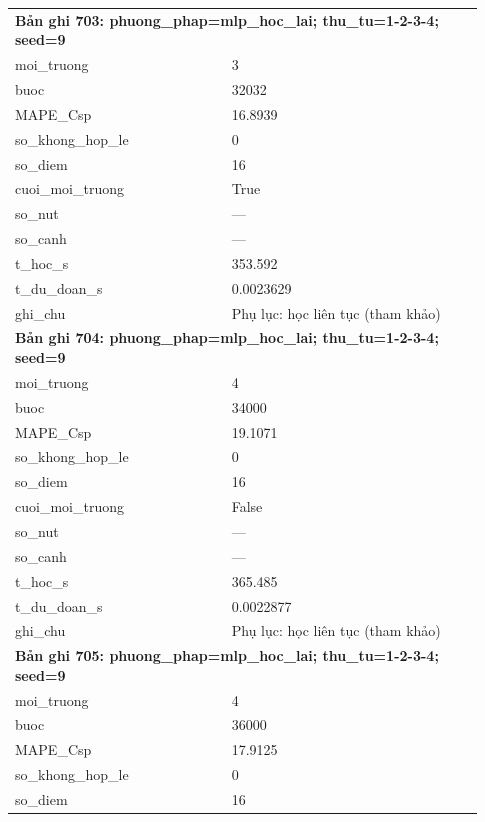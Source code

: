 \begin{longtable}{p{0.43\linewidth}p{0.50\linewidth}}
\midrule
\multicolumn{2}{p{0.95\linewidth}}{\textbf{Bản ghi 703: phuong\_phap=mlp\_hoc\_lai; thu\_tu=1-2-3-4; seed=9}} \\
moi\_\allowbreak truong & 3 \\
buoc & 32032 \\
MAPE\_\allowbreak Csp & 16.8939 \\
so\_\allowbreak khong\_\allowbreak hop\_\allowbreak le & 0 \\
so\_\allowbreak diem & 16 \\
cuoi\_\allowbreak moi\_\allowbreak truong & True \\
so\_\allowbreak nut & — \\
so\_\allowbreak canh & — \\
t\_\allowbreak hoc\_\allowbreak s & 353.592 \\
t\_\allowbreak du\_\allowbreak doan\_\allowbreak s & 0.0023629 \\
ghi\_\allowbreak chu & Phụ lục: học liên tục (tham khảo) \\
\midrule
\multicolumn{2}{p{0.95\linewidth}}{\textbf{Bản ghi 704: phuong\_phap=mlp\_hoc\_lai; thu\_tu=1-2-3-4; seed=9}} \\
moi\_\allowbreak truong & 4 \\
buoc & 34000 \\
MAPE\_\allowbreak Csp & 19.1071 \\
so\_\allowbreak khong\_\allowbreak hop\_\allowbreak le & 0 \\
so\_\allowbreak diem & 16 \\
cuoi\_\allowbreak moi\_\allowbreak truong & False \\
so\_\allowbreak nut & — \\
so\_\allowbreak canh & — \\
t\_\allowbreak hoc\_\allowbreak s & 365.485 \\
t\_\allowbreak du\_\allowbreak doan\_\allowbreak s & 0.0022877 \\
ghi\_\allowbreak chu & Phụ lục: học liên tục (tham khảo) \\
\midrule
\multicolumn{2}{p{0.95\linewidth}}{\textbf{Bản ghi 705: phuong\_phap=mlp\_hoc\_lai; thu\_tu=1-2-3-4; seed=9}} \\
moi\_\allowbreak truong & 4 \\
buoc & 36000 \\
MAPE\_\allowbreak Csp & 17.9125 \\
so\_\allowbreak khong\_\allowbreak hop\_\allowbreak le & 0 \\
so\_\allowbreak diem & 16 \\

\end{longtable}

